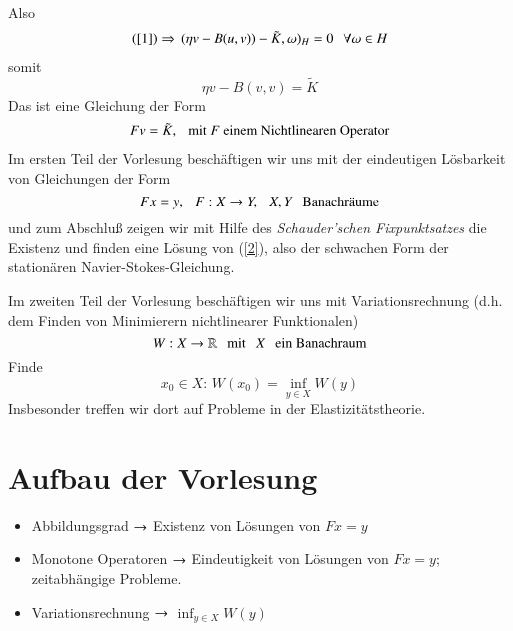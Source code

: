 Also
\begin{align*}
    (\ref{1}) \Rightarrow \, (\eta v - B(u,v)) - \tilde K , \omega)_H=0 \hspace{.25cm} \forall \omega \in H
\end{align*}
somit
\[
    \eta v - B(v,v) = \tilde K
\]
Das ist eine Gleichung der Form
\begin{align}\label{2}
    Fv=\tilde K,\hspace{.25cm}\text{mit $F$ einem Nichtlinearen Operator}
\end{align}
Im ersten Teil der Vorlesung beschäftigen wir uns mit der eindeutigen Lösbarkeit von
Gleichungen der Form
\[
    Fx=y, \hspace{.25cm} F:X\rightarrow Y, \hspace{.25cm} X,Y\hspace{.25cm} \text{Banachräume}
\]
und zum Abschluß zeigen wir mit Hilfe des \textit{Schauder'schen Fixpunktsatzes} die Existenz
und finden eine Lösung von (\ref{2}), also der schwachen Form der stationären 
Navier-Stokes-Gleichung.

Im zweiten Teil der Vorlesung beschäftigen wir uns mit Variationsrechnung (d.h. dem Finden
von Minimierern nichtlinearer Funktionalen)
\[
    W:X\rightarrow \mathbb{R} \hspace{.25cm}\text{mit} \hspace{.25cm} X \hspace{.25cm} \text{ein Banachraum}
\]
Finde 
\[
    x_0\in X: \, W(x_0)= \inf_{y\in X}W(y)
\]
Insbesonder treffen wir dort auf Probleme in der Elastizitätstheorie.

\section*{Aufbau der Vorlesung}
\begin{itemize}
    \item Abbildungsgrad $\rightarrow$ Existenz von Lösungen von $Fx=y$
    \item Monotone Operatoren $\rightarrow$ Eindeutigkeit von Lösungen von $Fx=y$; 
    	zeitabhängige Probleme.
    \item Variationsrechnung $\rightarrow$ $\inf_{y\in X} W(y)$
\end{itemize}
